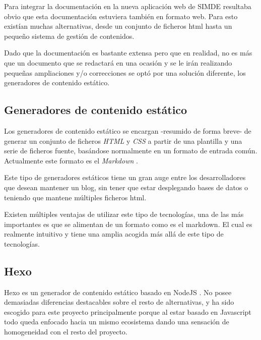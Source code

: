 Para integrar la documentación en la nueva aplicación web de SIMDE resultaba obvio que esta documentación
estuviera también en formato web. Para esto existían muchas alternativas, desde un conjunto de ficheros
html hasta un pequeño sistema de gestión de contenidos. 

\bigskip
Dado que la documentación es bastante extensa pero que en realidad, no es más que un documento 
que se redactará en una ocasión y se le irán realizando pequeñas ampliaciones y/o correcciones
se optó por una solución diferente, los generadores de contenido estático.

\subsection{Generadores de contenido estático}

Los generadores de contenido estático se encargan -resumido de forma breve- de generar 
un conjunto de ficheros \textit{HTML} y \textit{CSS} a partir de una plantilla y una serie 
de ficheros fuente, basándose normalmente en un formato de entrada común. Actualmente
este formato es el \textit{Markdown} \cite{GeneradoresEstaticos}. 

\bigskip
Este tipo de generadores estáticos tiene un gran auge entre los desarrolladores que desean 
mantener un blog, sin tener que estar desplegando bases de datos o teniendo que mantene múltiples
ficheros html. 

\bigskip 
Existen múltiples ventajas de utilizar este tipo de tecnologías, una de las más importantes
 es que se alimentan de un formato como es el markdown. El cual es realmente intuitivo 
 y tiene una amplia acogida más allá de este tipo de tecnologías. 

\subsection{Hexo}

Hexo es un generador de contenido estático basado en NodeJS \cite{Hexo}. 
No posee demasiadas diferencias destacables sobre el resto de alternativas,
y ha sido escogido para este proyecto principalmente porque al estar
basado en Javascript todo queda enfocado hacia un mismo ecosistema dando una 
sensación de homogeneidad con el resto del proyecto.